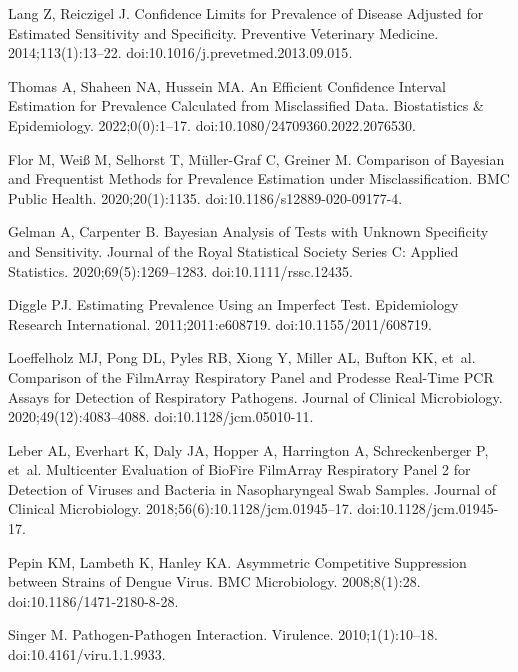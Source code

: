 \documentclass[10pt,letterpaper]{article}
\begin{document}
\begin{thebibliography}{10}
Lang Z, Reiczigel J.
\newblock Confidence Limits for Prevalence of Disease Adjusted for Estimated
  Sensitivity and Specificity.
\newblock Preventive Veterinary Medicine. 2014;113(1):13--22.
\newblock doi:{10.1016/j.prevetmed.2013.09.015}.

Thomas A, Shaheen NA, Hussein MA.
\newblock An Efficient Confidence Interval Estimation for Prevalence Calculated
  from Misclassified Data.
\newblock Biostatistics \& Epidemiology. 2022;0(0):1--17.
\newblock doi:{10.1080/24709360.2022.2076530}.

Flor M, Weiß M, Selhorst T, {Müller-Graf} C, Greiner M.
\newblock Comparison of {{Bayesian}} and Frequentist Methods for Prevalence
  Estimation under Misclassification.
\newblock BMC Public Health. 2020;20(1):1135.
\newblock doi:{10.1186/s12889-020-09177-4}.

Gelman A, Carpenter B.
\newblock Bayesian {{Analysis}} of {{Tests}} with {{Unknown Specificity}} and
  {{Sensitivity}}.
\newblock Journal of the Royal Statistical Society Series C: Applied
  Statistics. 2020;69(5):1269--1283.
\newblock doi:{10.1111/rssc.12435}.

Diggle PJ.
\newblock Estimating {{Prevalence Using}} an {{Imperfect Test}}.
\newblock Epidemiology Research International. 2011;2011:e608719.
\newblock doi:{10.1155/2011/608719}.

Loeffelholz MJ, Pong DL, Pyles RB, Xiong Y, Miller AL, Bufton KK, et~al.
\newblock Comparison of the {{FilmArray Respiratory Panel}} and {{Prodesse
  Real-Time PCR Assays}} for {{Detection}} of {{Respiratory Pathogens}}.
\newblock Journal of Clinical Microbiology. 2020;49(12):4083--4088.
\newblock doi:{10.1128/jcm.05010-11}.

Leber AL, Everhart K, Daly JA, Hopper A, Harrington A, Schreckenberger P,
  et~al.
\newblock Multicenter {{Evaluation}} of {{BioFire FilmArray Respiratory Panel}}
  2 for {{Detection}} of {{Viruses}} and {{Bacteria}} in {{Nasopharyngeal Swab
  Samples}}.
\newblock Journal of Clinical Microbiology. 2018;56(6):10.1128/jcm.01945--17.
\newblock doi:{10.1128/jcm.01945-17}.

Pepin KM, Lambeth K, Hanley KA.
\newblock Asymmetric Competitive Suppression between Strains of Dengue Virus.
\newblock BMC Microbiology. 2008;8(1):28.
\newblock doi:{10.1186/1471-2180-8-28}.

Singer M.
\newblock Pathogen-Pathogen Interaction.
\newblock Virulence. 2010;1(1):10--18.
\newblock doi:{10.4161/viru.1.1.9933}.


\end{thebibliography}
\end{document}
